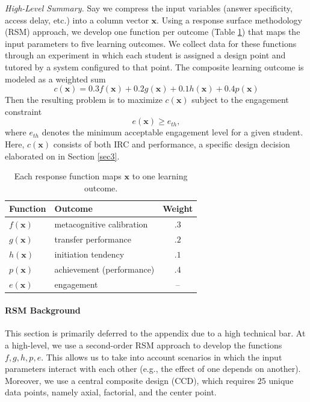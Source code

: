 \documentclass[12pt]{article}
\begin{document}
\textit{High-Level Summary.} Say we compress the input variables (answer specificity, access delay, etc.) into a column vector $\mathbf{x}$. Using a response surface methodology (RSM) approach, we develop one function per outcome (Table \ref{oink}) that maps the input parameters to five learning outcomes. We collect data for these functions through an experiment in which each student is assigned a design point and tutored by a system configured to that point. The composite learning outcome is modeled as a weighted sum
\[
c(\mathbf{x})=0.3 f(\mathbf{x})+0.2 g(\mathbf{x})+0.1 h(\mathbf{x}) + 0.4 p(\mathbf{x})
\]
Then the resulting problem is to maximize \(c(\mathbf{x})\) subject to the engagement constraint
\[
e(\mathbf{x})\ge e_{th},
\]
where \(e_{th}\) denotes the minimum acceptable engagement level for a given student. Here, $c(\mathbf{x})$ consists of both IRC and performance, a specific design decision elaborated on in Section \ref{sec3}.

\begin{table}[h]
\centering
\begin{tabular}{@{}llc@{}}
\toprule
Function & Outcome & Weight \\
\midrule
$f(\mathbf{x})$ & metacognitive calibration & $.3$ \\
$g(\mathbf{x})$ & transfer performance      & $.2$ \\
$h(\mathbf{x})$ & initiation tendency       & $.1$ \\
$p(\mathbf{x})$ & achievement (performance) & $.4$\\
$e(\mathbf{x})$ & engagement                & -- \\
\bottomrule
\end{tabular}
\caption{Each response function maps $\mathbf{x}$ to one learning
outcome.}
\label{oink}
\end{table}

\paragraph{RSM Background}

This section is primarily deferred to the appendix due to a high technical bar. At a high-level, we use a second-order RSM approach to develop the functions $f, g, h, p, e$. This allows us to take into account scenarios in which the input parameters interact with each other (e.g., the effect of one depends on another). Moreover, we use a central composite design (CCD), which requires $25$ unique data points, namely axial, factorial, and the center point.
\end{document}
